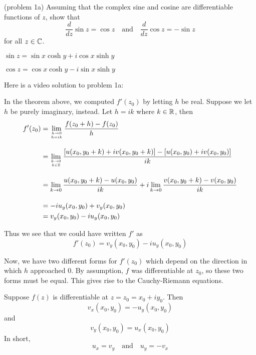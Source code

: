 \documentclass[handout]{ximera}
\begin{document}
\begin{problem}(problem 1a)
Assuming that the complex sine and cosine are differentiable functions of $z$, show that
\[
\frac{d}{dz} \sin z = \cos z \quad \mbox{and} \quad \frac{d}{dz} \cos z = -\sin z
\]
for all $z \in \mathbb C$.
\begin{hint}
$\sin z = \sin x \cosh y + i \cos x \sinh y$
\end{hint}
\begin{hint}
$\cos z = \cos x \cosh y - i \sin x \sinh y$
\end{hint}
\end{problem}

Here is a video solution to problem 1a:\\
\begin{foldable}
\end{foldable}

In the theorem above, we computed $f'(z_0)$ by letting $h$ be real.  
Suppose we let $h$ be purely imaginary, instead.
Let $h = ik$ where $k \in \mathbb R$, then
\begin{align*}
f'(z_0) &= \lim_{h \to 0 \atop h = ik} \frac{f(z_0 + h) -f(z_0)}{h} \\[10pt]
        &= \lim_{k \to 0 \atop k \in \mathbb R} \frac{\left[u(x_0 , y_0+k) + iv(x_0 , y_0+k)\right] -
         \left[u(x_0,y_0)+iv(x_0, y_0)\right]}{ik} \\[10pt]
        &=  \lim_{k \to 0} \frac{u(x_0 , y_0+k)- u(x_0,y_0)}{ik} +
        i\lim_{k \to 0}\frac{v(x_0 , y_0+k)-v(x_0, y_0)}{ik} \\[10pt]
        &= -iu_y(x_0,y_0) + v_y(x_0,y_0)\\
        &=  v_y(x_0,y_0)-iu_y(x_0,y_0)
\end{align*}

Thus we see that we could have written $f'$ as
\[
f'(z_0) = v_y(x_0,y_0)-iu_y(x_0,y_0)
\]

Now, we have two different forms for $f'(z_0)$ which depend on the direction in which $h$ approached $0$.
By assumption, $f$ was differentiable at $z_0$, so these two forms must be equal. 
This gives rise to the Cauchy-Riemann equations.


\begin{theorem}
Suppose $f(z)$ is differentiable at $z = z_0 = x_0 +iy_0$. Then
\[
v_x(x_0,y_0)= -u_y(x_0,y_0) 
\]
and 
\[
v_y(x_0,y_0) = u_x(x_0,y_0)
\]
In short, 
\[
u_x =v_y \quad \mbox{and} \quad u_y = -v_x
\]
\end{theorem}
\end{document}
